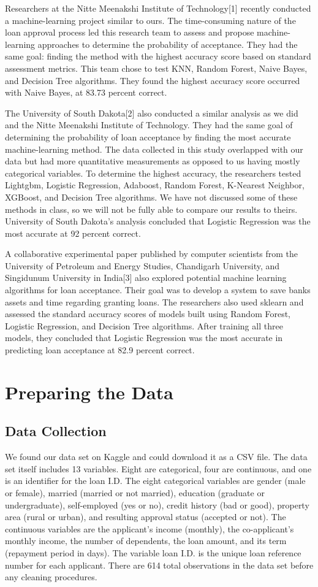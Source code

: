 \documentclass{article}
\begin{document}
Researchers at the Nitte Meenakshi Institute of Technology[1] recently conducted a machine-learning project similar to ours. The time-consuming nature of the loan approval process led this research team to assess and propose machine-learning approaches to determine the probability of acceptance. They had the same goal: finding the method with the highest accuracy score based on standard assessment metrics. This team chose to test KNN, Random Forest, Naive Bayes, and Decision Tree algorithms. They found the highest accuracy score occurred with Naive Bayes, at 83.73 percent correct. 

The University of South Dakota[2] also conducted a similar analysis as we did and the Nitte Meenakshi Institute of Technology. They had the same goal of determining the probability of loan acceptance by finding the most accurate machine-learning method. The data collected in this study overlapped with our data but had more quantitative measurements as opposed to us having mostly categorical variables. To determine the highest accuracy, the researchers tested  Lightgbm, Logistic Regression, Adaboost, Random Forest, K-Nearest Neighbor, XGBoost, and Decision Tree algorithms. We have not discussed some of these methods in class, so we will not be fully able to compare our results to theirs. University of South Dakota's analysis concluded that Logistic Regression was the most accurate at 92 percent correct. 

A collaborative experimental paper published by computer scientists from the University of Petroleum and Energy Studies, Chandigarh University, and Singidunum University in India[3] also explored potential machine learning algorithms for loan acceptance. Their goal was to develop a system to save banks assets and time regarding granting loans. The researchers also used sklearn and assessed the standard accuracy scores of models built using Random Forest, Logistic Regression, and Decision Tree algorithms. After training all three models, they concluded that Logistic Regression was the most accurate in predicting loan acceptance at 82.9 percent correct. 

\section{Preparing the Data}
\subsection{Data Collection}
We found our data set on Kaggle and could download it as a CSV file. The data set itself includes 13 variables. Eight are categorical, four are continuous, and one is an identifier for the loan I.D. The eight categorical variables are gender (male or female), married (married or not married), education (graduate or undergraduate), self-employed (yes or no), credit history (bad or good), property area (rural or urban), and resulting approval status (accepted or not). The continuous variables are the applicant's income (monthly), the co-applicant's monthly income, the number of dependents, the loan amount, and its term (repayment period in days). The variable loan I.D. is the unique loan reference number for each applicant. There are 614 total observations in the data set before any cleaning procedures. 
\end{document}
